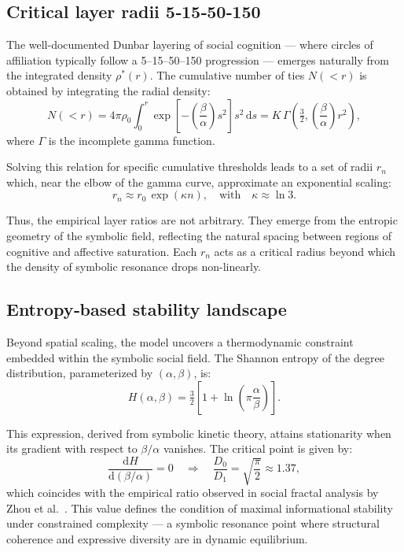 \subsection{Critical layer radii 5‑15‑50‑150}\label{sec:layers}

The well-documented Dunbar layering of social cognition — where circles of affiliation typically follow a 5–15–50–150 progression — emerges naturally from the integrated density \(\rho^\ast(r)\). The cumulative number of ties \(N(<r)\) is obtained by integrating the radial density:
\[
N(<r) = 4\pi \rho_0 \int_{0}^{r} \exp\left[-\left(\frac{\beta}{\alpha}\right)s^2\right]s^2\,\mathrm{d}s = K\,\Gamma\!\left(\tfrac{3}{2}, \left(\frac{\beta}{\alpha}\right)r^2\right),
\]
where \(\Gamma\) is the incomplete gamma function.

Solving this relation for specific cumulative thresholds leads to a set of radii \(r_n\) which, near the elbow of the gamma curve, approximate an exponential scaling:
\begin{equation}
r_n \approx r_0\,\exp(\kappa n),\quad \text{with} \quad \kappa \approx \ln 3.
\end{equation}

Thus, the empirical layer ratios are not arbitrary. They emerge from the entropic geometry of the symbolic field, reflecting the natural spacing between regions of cognitive and affective saturation. Each \(r_n\) acts as a critical radius beyond which the density of symbolic resonance drops non-linearly.

\subsection{Entropy‑based stability landscape}\label{sec:entropyland}

Beyond spatial scaling, the model uncovers a thermodynamic constraint embedded within the symbolic social field. The Shannon entropy of the degree distribution, parameterized by \((\alpha, \beta)\), is:
\begin{equation}
H(\alpha, \beta) = \tfrac{3}{2}\left[1 + \ln\left(\pi \frac{\alpha}{\beta}\right)\right].
\end{equation}

This expression, derived from symbolic kinetic theory, attains stationarity when its gradient with respect to \(\beta/\alpha\) vanishes. The critical point is given by:
\[
\frac{\mathrm{d}H}{\mathrm{d}(\beta/\alpha)} = 0 \quad \Rightarrow \quad \frac{D_0}{D_1} = \sqrt{\frac{\pi}{2}} \approx 1.37,
\]
which coincides with the empirical ratio observed in social fractal analysis by Zhou et al.~\cite{zhou2005}. This value defines the condition of maximal informational stability under constrained complexity — a symbolic resonance point where structural coherence and expressive diversity are in dynamic equilibrium.
